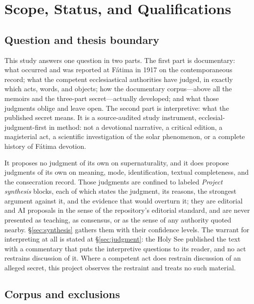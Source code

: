 \sectionguard
\section{Scope, Status, and Qualifications}

\subsection*{Question and thesis boundary}

This study answers one question in two parts. The first part is
documentary: what occurred and was reported at F\'atima in 1917 on
the contemporaneous record; what the competent ecclesiastical
authorities have judged, in exactly which acts, words, and objects;
how the documentary corpus---above all the memoirs and the three-part
secret---actually developed; and what those judgments oblige and
leave open. The second part is interpretive: what the published
secret means. It is a source-audited study instrument,
ecclesial-judgment-first in method: not a devotional narrative, a
critical edition, a magisterial act, a scientific investigation of
the solar phenomenon, or a complete history of F\'atima devotion.

It proposes no judgment of its own on supernaturality, and it does
propose judgments of its own on meaning, mode, identification,
textual completeness, and the consecration record. Those judgments
are confined to labeled \emph{Project synthesis} blocks, each of
which states the judgment, its reasons, the strongest argument
against it, and the evidence that would overturn it; they are
editorial and AI proposals in the sense of the repository's editorial
standard, and are never presented as teaching, as consensus, or as
the sense of any authority quoted nearby. \S\ref{sec:synthesis}
gathers them with their confidence levels. The warrant for
interpreting at all is stated at \S\ref{sec:judgment}: the Holy See
published the text with a commentary that puts the interpretive
questions to its reader, and no act restrains discussion of it.
Where a competent act does restrain discussion of an alleged secret,
this project observes the restraint and treats no such material.

\subsection*{Corpus and exclusions}

